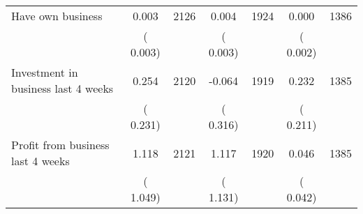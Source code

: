 \begin{tabular}{l*{6}{c}}
Have own business        &              0.003      &       2126       &              0.004      &       1924       &              0.000      &       1386       \\
                       &       (       0.003)            &                               &       (       0.003)            &                               &       (       0.002)            &                               \\
Investment in business last 4 weeks        &              0.254      &       2120       &             -0.064      &       1919       &              0.232      &       1385       \\
                       &       (       0.231)            &                               &       (       0.316)            &                               &       (       0.211)            &                               \\
Profit from business last 4 weeks        &              1.118      &       2121       &              1.117      &       1920       &              0.046      &       1385       \\
                       &       (       1.049)            &                               &       (       1.131)            &                               &       (       0.042)            &                               \\
\hline \end{tabular}